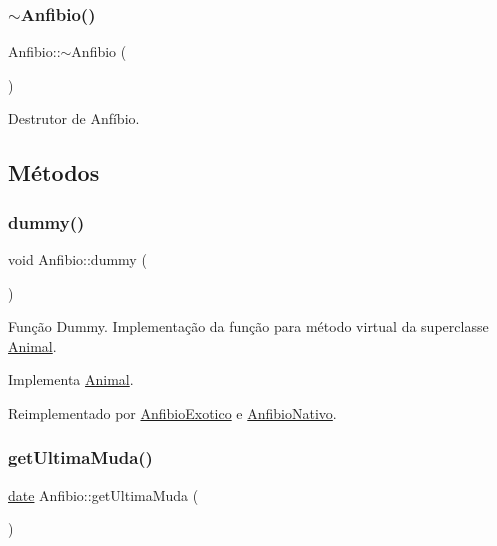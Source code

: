 \subsubsection{\texorpdfstring{$\sim$\+Anfibio()}{~Anfibio()}}
{\footnotesize\ttfamily Anfibio\+::$\sim$\+Anfibio (\begin{DoxyParamCaption}{ }\end{DoxyParamCaption})}

Destrutor de Anfíbio. 

\subsection{Métodos}
\mbox{\label{classAnfibio_a5f92eac4e6add9b2798119cc38dda093}} 
\subsubsection{\texorpdfstring{dummy()}{dummy()}}
{\footnotesize\ttfamily void Anfibio\+::dummy (\begin{DoxyParamCaption}{ }\end{DoxyParamCaption})\hspace{0.3cm}{\ttfamily [virtual]}}

Função Dummy. Implementação da função para método virtual da superclasse \hyperlink{classAnimal}{Animal}. 

Implementa \hyperlink{classAnimal_a88fa81bb01530eaa71656b678bf05b5b}{Animal}.



Reimplementado por \hyperlink{classAnfibioExotico_a192645b6588bc584145f70be14862d77}{Anfibio\+Exotico} e \hyperlink{classAnfibioNativo_ace45796a9ce43d12b992182643aeb94e}{Anfibio\+Nativo}.

\mbox{\label{classAnfibio_a762169971fc7ad9065d944266c2507b3}} 
\subsubsection{\texorpdfstring{get\+Ultima\+Muda()}{getUltimaMuda()}}
{\footnotesize\ttfamily \hyperlink{classdate}{date} Anfibio\+::get\+Ultima\+Muda (\begin{DoxyParamCaption}{ }\end{DoxyParamCaption})}

